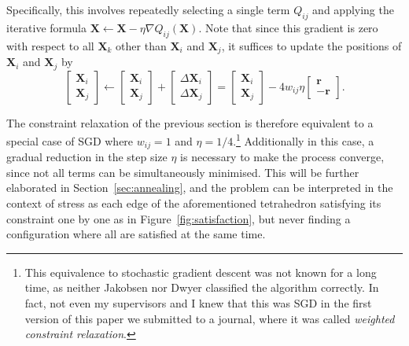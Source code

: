 Specifically, this involves repeatedly selecting a single term $Q_{ij}$ and applying the iterative formula $\mathbf{X}\leftarrow \mathbf{X}-\eta\nabla Q_{ij}(\mathbf{X})$.
Note that since this gradient is zero with respect to all $\mathbf{X}_k$ other than $\mathbf{X}_i$ and $\mathbf{X}_j$, it suffices to update the positions of $\mathbf{X}_i$ and $\mathbf{X}_j$ by
\begin{equation}
  \begin{bmatrix}\mathbf{X}_i\\\mathbf{X}_j\end{bmatrix}
  \leftarrow
  \begin{bmatrix}\mathbf{X}_i\\\mathbf{X}_j\end{bmatrix}+
  \begin{bmatrix}\Delta \mathbf{X}_i\\\Delta \mathbf{X}_j\end{bmatrix}
  =
  \begin{bmatrix}\mathbf{X}_i\\\mathbf{X}_j\end{bmatrix}-
  4w_{ij}\eta
  \begin{bmatrix}\mathbf{r}\\-\mathbf{r}\end{bmatrix}.
  \label{eq:SGD_step}
\end{equation}

The constraint relaxation of the previous section is therefore equivalent to a special case of SGD where $w_{ij}=1$ and $\eta=1/4$.\footnote{This equivalence to stochastic gradient descent was not known for a long time, as neither Jakobsen \cite{Jakobsen2001} nor Dwyer \cite{Dwyer2009} classified the algorithm correctly. In fact, not even my supervisors and I knew that this was SGD in the first version of this paper we submitted to a journal, where it was called \emph{weighted constraint relaxation}.}
Additionally in this case, a gradual reduction in the step size $\eta$ is necessary to make the process converge, since not all terms can be simultaneously minimised. This will be further elaborated in Section~\ref{sec:annealing}, and the problem can be interpreted in the context of stress as each edge of the aforementioned tetrahedron satisfying its constraint one by one as in Figure~\ref{fig:satisfaction}, but never finding a configuration where all are satisfied at the same time.

